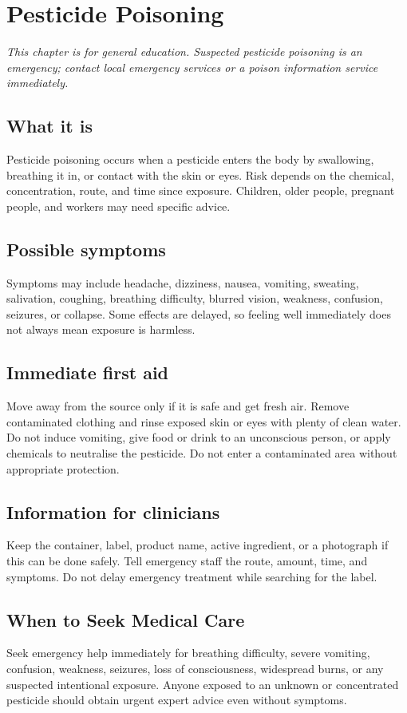 \chapter{Pesticide Poisoning}

\medskip
\noindent\textit{This chapter is for general education. Suspected pesticide poisoning is an emergency; contact local emergency services or a poison information service immediately.}

\section*{What it is}
Pesticide poisoning occurs when a pesticide enters the body by swallowing, breathing it in, or contact with the skin or eyes. Risk depends on the chemical, concentration, route, and time since exposure. Children, older people, pregnant people, and workers may need specific advice.

\section*{Possible symptoms}
Symptoms may include headache, dizziness, nausea, vomiting, sweating, salivation, coughing, breathing difficulty, blurred vision, weakness, confusion, seizures, or collapse. Some effects are delayed, so feeling well immediately does not always mean exposure is harmless.

\section*{Immediate first aid}
Move away from the source only if it is safe and get fresh air. Remove contaminated clothing and rinse exposed skin or eyes with plenty of clean water. Do not induce vomiting, give food or drink to an unconscious person, or apply chemicals to neutralise the pesticide. Do not enter a contaminated area without appropriate protection.

\section*{Information for clinicians}
Keep the container, label, product name, active ingredient, or a photograph if this can be done safely. Tell emergency staff the route, amount, time, and symptoms. Do not delay emergency treatment while searching for the label.

\section*{When to Seek Medical Care}
Seek emergency help immediately for breathing difficulty, severe vomiting, confusion, weakness, seizures, loss of consciousness, widespread burns, or any suspected intentional exposure. Anyone exposed to an unknown or concentrated pesticide should obtain urgent expert advice even without symptoms.

